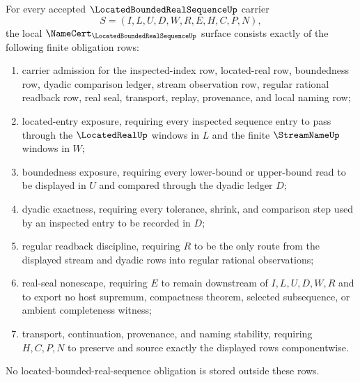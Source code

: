 \begin{theorem}
\label{thm:located-bounded-real-sequence-namecert-obligations}
For every accepted $\LocatedBoundedRealSequenceUp$ carrier
$$
S=(I,L,U,D,W,R,E,H,C,P,N),
$$
the local $\NameCert_{\LocatedBoundedRealSequenceUp}$ surface consists exactly of the following finite obligation rows:
\begin{enumerate}
\item carrier admission for the inspected-index row, located-real row, boundedness row, dyadic comparison ledger, stream observation row, regular rational readback row, real seal, transport, replay, provenance, and local naming row;
\item located-entry exposure, requiring every inspected sequence entry to pass through the $\LocatedRealUp$ windows in $L$ and the finite $\StreamNameUp$ windows in $W$;
\item boundedness exposure, requiring every lower-bound or upper-bound read to be displayed in $U$ and compared through the dyadic ledger $D$;
\item dyadic exactness, requiring every tolerance, shrink, and comparison step used by an inspected entry to be recorded in $D$;
\item regular readback discipline, requiring $R$ to be the only route from the displayed stream and dyadic rows into regular rational observations;
\item real-seal nonescape, requiring $E$ to remain downstream of $I,L,U,D,W,R$ and to export no host supremum, compactness theorem, selected subsequence, or ambient completeness witness;
\item transport, continuation, provenance, and naming stability, requiring $H,C,P,N$ to preserve and source exactly the displayed rows componentwise.
\end{enumerate}
No located-bounded-real-sequence obligation is stored outside these rows.
\end{theorem}

